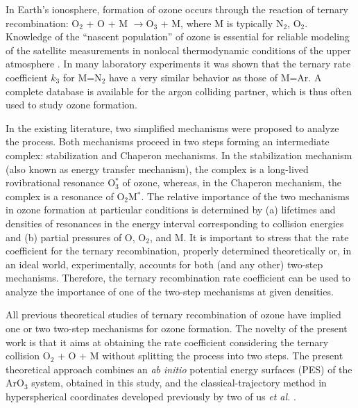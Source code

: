 \documentclass[aps,prl,twocolumn,showpacs,preprintnumbers,amsmath,amssymb,floatfix]{revtex4-2}
\begin{document}

In Earth's ionosphere, formation of ozone occurs through the reaction of ternary recombination: O$_2$ + O + M $\rightarrow $O$_3$ + M, where M is typically N$_2$, O$_2$. Knowledge of the “nascent population”  of ozone is essential for reliable modeling of the satellite measurements in nonlocal thermodynamic conditions of the upper atmosphere \cite{l2001non,Kaufmann2006,feofilov2012infrared}. In many laboratory experiments \cite{hippler1990temperature,rawlins1987dynamics,LUT05:2764,janssen2001kinetic} it was shown that the ternary rate coefficient  $k_3$  for M=N$_2$ have a very similar behavior as those of M=Ar. A complete database is available \cite{LUT05:2764} for the argon colliding partner, which is thus often used to study ozone formation.


In the existing literature, two simplified mechanisms were proposed to analyze the process. Both mechanisms proceed in two steps forming an intermediate complex: stabilization and Chaperon mechanisms. In the stabilization mechanism (also known as energy transfer mechanism), the complex is a long-lived rovibrational resonance O$_3^*$ of ozone, whereas, in the Chaperon mechanism, the complex is a resonance of O$_2$M$^*$. The relative importance of the two mechanisms in ozone formation at particular conditions is determined by (a) lifetimes and densities of resonances in the energy interval corresponding to collision energies and (b) partial pressures of O, O$_2$, and M.  It is important to stress that the rate coefficient for the ternary recombination, properly determined theoretically or, in an ideal world, experimentally, accounts for both (and any other) two-step mechanisms. Therefore, the ternary recombination rate coefficient can be used to analyze the importance of one of the two-step mechanisms at given densities. 

All previous theoretical studies of ternary recombination of ozone have implied one or two two-step mechanisms for ozone formation. The novelty of the present work is that it aims at obtaining the rate coefficient considering the ternary collision O$_2$ + O + M without splitting the process into two steps. The present theoretical approach combines an {\it ab initio} potential energy surfaces (PES) of the ArO$_3$ system, obtained in this study, and the classical-trajectory method in hyperspherical coordinates developed previously by two of us {\it et al.} \cite{Perez-Rios2014,Greene2017,Mirahmadi2021}.
\end{document}
